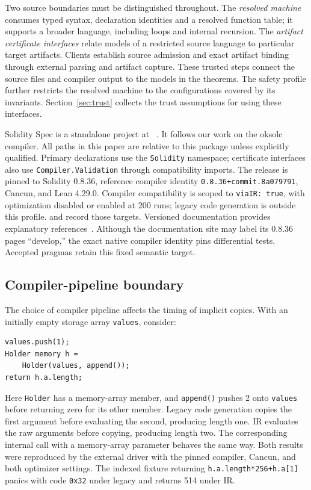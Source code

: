 \documentclass[conference]{IEEEtran}
\newcommand{\code}[1]{\texttt{#1}}
\begin{document}
Two source boundaries must be distinguished throughout. The \emph{resolved
machine} consumes typed syntax, declaration identities and a resolved function
table; it supports a broader language, including loops and internal recursion.
The \emph{artifact certificate interfaces} relate models of a restricted
source language to particular target artifacts. Clients establish source
admission and exact artifact binding through external parsing and artifact
capture. These trusted steps connect the source files and compiler output to
the models in the theorems. The safety profile further restricts the resolved
machine to the configurations covered by its invariants. Section~\ref{sec:trust}
collects the trust assumptions for using these interfaces.

Solidity Spec is a standalone project at
~\cite{artifact}. It follows our work on the
oksolc compiler. All paths in this paper are relative to this package unless
explicitly qualified. Primary declarations use the \code{Solidity} namespace;
certificate interfaces also use \code{Compiler.Validation} through
compatibility imports. The release is pinned to Solidity 0.8.36, reference
compiler identity \code{0.8.36+commit.8a079791}, Cancun, and Lean 4.29.0.
Compiler compatibility is scoped to \code{viaIR: true}, with optimization
disabled or enabled at 200 runs; legacy code generation is outside this profile.
 and  record those targets.
Versioned documentation provides explanatory references~\cite{control,abi,layout,types}.
Although the documentation site may label its 0.8.36 pages ``develop,'' the exact
native compiler identity pins differential tests. Accepted pragmas retain this
fixed semantic target.

\subsection{Compiler-pipeline boundary}
The choice of compiler pipeline affects the timing of implicit copies. With an initially
empty storage array \code{values}, consider:
\begin{verbatim}
values.push(1);
Holder memory h =
    Holder(values, append());
return h.a.length;
\end{verbatim}
Here \code{Holder} has a memory-array member, and \code{append()} pushes 2
onto \code{values} before returning zero for its other member. Legacy code
generation copies the first argument before evaluating the second, producing
length one. IR evaluates the raw arguments before copying, producing length
two. The corresponding internal call with a memory-array parameter behaves
the same way. Both results were reproduced by the external driver with the pinned
compiler, Cancun, and both optimizer settings. The indexed fixture returning
\code{h.a.length*256+h.a[1]} panics with code \code{0x32} under legacy and
returns 514 under IR.
\end{document}
